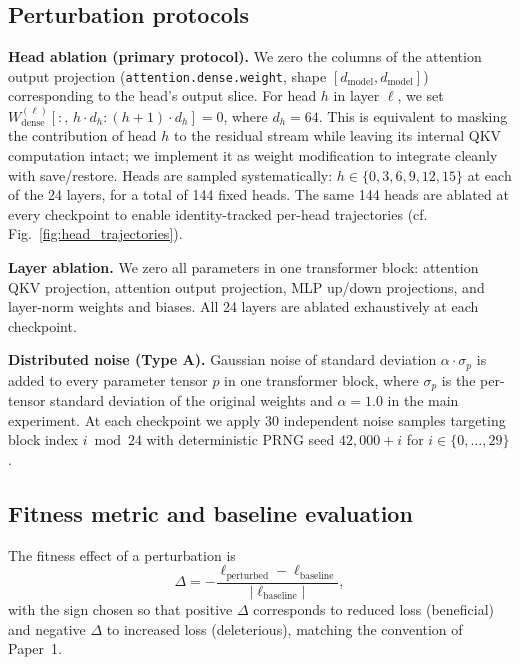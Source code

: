 \documentclass{article}
\begin{document}
\subsection{Perturbation protocols}

\textbf{Head ablation (primary protocol).} We zero the columns of the attention output projection (\texttt{attention.dense.weight}, shape $[d_\text{model}, d_\text{model}]$) corresponding to the head's output slice. For head $h$ in layer $\ell$, we set $W_\text{dense}^{(\ell)}[:,\, h \cdot d_h : (h+1) \cdot d_h] = 0$, where $d_h = 64$. This is equivalent to masking the contribution of head $h$ to the residual stream while leaving its internal QKV computation intact; we implement it as weight modification to integrate cleanly with save/restore. Heads are sampled systematically: $h \in \{0, 3, 6, 9, 12, 15\}$ at each of the 24 layers, for a total of 144 fixed heads. The same 144 heads are ablated at every checkpoint to enable identity-tracked per-head trajectories (cf. Fig.~\ref{fig:head_trajectories}).

\textbf{Layer ablation.} We zero all parameters in one transformer block: attention QKV projection, attention output projection, MLP up/down projections, and layer-norm weights and biases. All 24 layers are ablated exhaustively at each checkpoint.

\textbf{Distributed noise (Type A).} Gaussian noise of standard deviation $\alpha \cdot \sigma_p$ is added to every parameter tensor $p$ in one transformer block, where $\sigma_p$ is the per-tensor standard deviation of the original weights and $\alpha = 1.0$ in the main experiment. At each checkpoint we apply 30 independent noise samples targeting block index $i \bmod 24$ with deterministic PRNG seed $42{,}000 + i$ for $i \in \{0, \ldots, 29\}$.

\subsection{Fitness metric and baseline evaluation}

The fitness effect of a perturbation is
$$\Delta = -\frac{\ell_\text{perturbed} - \ell_\text{baseline}}{|\ell_\text{baseline}|},$$
with the sign chosen so that positive $\Delta$ corresponds to reduced loss (beneficial) and negative $\Delta$ to increased loss (deleterious), matching the convention of Paper~1.
\end{document}
